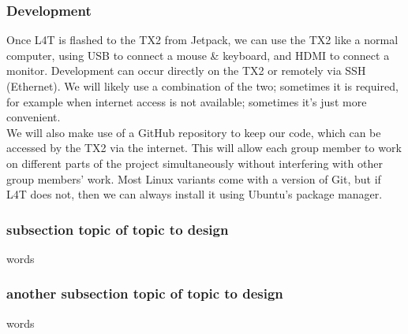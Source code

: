 \documentclass[letterpaper,10pt,serif,draftclsnofoot,onecolumn,compsoc,titlepage]{IEEEtran}
\begin{document}
\subsubsection{Development}
Once L4T is flashed to the TX2 from Jetpack, we can use the TX2 like a normal computer, using USB to connect a mouse \& keyboard, and HDMI to connect a monitor. Development can occur directly on the TX2 or remotely via SSH (Ethernet). We will likely use a combination of the two; sometimes it is required, for example when internet access is not available; sometimes it’s just more convenient.
\\
We will also make use of a GitHub repository to keep our code, which can be accessed by the TX2 via the internet. This will allow each group member to work on different parts of the project simultaneously without interfering with other group members’ work. Most Linux variants come with a version of Git, but if L4T does not, then we can always install it using Ubuntu’s package manager.

\subsubsection{subsection topic of topic to design}

words \\

\subsubsection{another subsection topic of topic to design}

words \\


\nocite{*}
%
%
\end{document}
